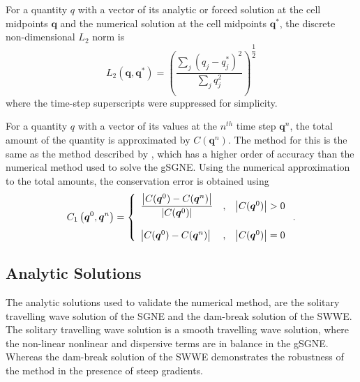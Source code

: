 \documentclass[10pt]{elsarticle}
\newcommand{\vecn}[1]{\boldsymbol{#1}}
\providecommand{\DIFaddtex}[1]{{\protect\color{blue} \sf #1}} %
\providecommand{\DIFdeltex}[1]{{\protect\color{red} \scriptsize #1}} %
\providecommand{\DIFaddbegin}{} %
\providecommand{\DIFaddend}{} %
\providecommand{\DIFdelbegin}{} %
\providecommand{\DIFdelend}{} %
\providecommand{\DIFadd}[1]{\texorpdfstring{\DIFaddtex{#1}}{#1}} %
\providecommand{\DIFdel}[1]{\texorpdfstring{\DIFdeltex{#1}}{}} %
\newcommand{\DIFscaledelfig}{0.5}
\newlength{\DIFdelgraphicswidth} %
\newlength{\DIFdelgraphicsheight} %
\newcommand{\DIFaddincludegraphics}[2][]{{\color{blue}\fbox{\DIFOincludegraphics[#1]{#2}}}} %
\newcommand{\DIFdelincludegraphics}[2][]{%
\sbox{\DIFdelgraphicsbox}{\DIFOincludegraphics[#1]{#2}}%
\settoboxwidth{\DIFdelgraphicswidth}{\DIFdelgraphicsbox} %
\settoboxtotalheight{\DIFdelgraphicsheight}{\DIFdelgraphicsbox} %
\scalebox{\DIFscaledelfig}{%
\parbox[b]{\DIFdelgraphicswidth}{\usebox{\DIFdelgraphicsbox}\\[-\baselineskip] \rule{\DIFdelgraphicswidth}{0em}}\llap{\resizebox{\DIFdelgraphicswidth}{\DIFdelgraphicsheight}{%
\setlength{\unitlength}{\DIFdelgraphicswidth}%
\begin{picture}(1,1)%
\thicklines\linethickness{2pt} %
{\color[rgb]{1,0,0}\put(0,0){\framebox(1,1){}}}%
{\color[rgb]{1,0,0}\put(0,0){\line( 1,1){1}}}%
{\color[rgb]{1,0,0}\put(0,1){\line(1,-1){1}}}%
\end{picture}%
}\hspace*{3pt}}} %
} %
\DeclareRobustCommand{\DIFaddbegin}{\DIFOaddbegin \let\includegraphics\DIFaddincludegraphics} %
\DeclareRobustCommand{\DIFaddend}{\DIFOaddend \let\includegraphics\DIFOincludegraphics} %
\DeclareRobustCommand{\DIFdelbegin}{\DIFOdelbegin \let\includegraphics\DIFdelincludegraphics} %
\DeclareRobustCommand{\DIFdelend}{\DIFOaddend \let\includegraphics\DIFOincludegraphics} %
\begin{document}
For a quantity $q$ with a vector of its analytic or forced solution at the cell midpoints $\vecn{q}$ and the numerical solution at the cell midpoints $\vecn{q}^*$, the discrete non-dimensional $L_2$ norm is
\begin{equation}
\label{eqn:Conv_Error}
L_2\left(\vecn{q},\vecn{q}^*\right) = \left( \dfrac{\displaystyle\sum_{j}^{}  \left(q_j - q^*_j\right)^2}{\displaystyle\sum_{j}^{}  q_j^2 } \right)^{\dfrac{1}{2}}
\end{equation}
where the time-step superscripts were suppressed for simplicity.

For a quantity $q$ with a vector of its values at the $n^{th}$ time step $\vecn{q}^n$, the total amount of the quantity is approximated by $C(\vecn{q}^n)$. The method for this is the same as the method described by \citet{Zoppou-etal-2017}, which has a higher order of accuracy than the numerical method used to solve the gSGNE. Using the numerical approximation to the total amounts, the conservation error is obtained using
\begin{equation}
\label{eqn:Cons_Error}
C_1\left(\vecn{q}^0,\vecn{q}^n\right) = \left \lbrace \begin{array}{l c r}
\dfrac{\left | C(\vecn{q}^0) - C(\vecn{q}^n) \right |}{\left| C(\vecn{q}^0) \right|} &,& \left| C(\vecn{q}^0) \right| > 0 \\ \\
\left | C(\vecn{q}^0) - C(\vecn{q}^n) \right |&,& \left| C(\vecn{q}^0) \right| = 0 
\end{array} \right. .
\end{equation}


\subsection{Analytic Solutions}
\label{sec:AnaSol}
The analytic solutions used to validate the numerical method, are the solitary travelling wave solution of the SGNE and the dam-break solution of the SWWE. The solitary travelling wave solution is a smooth travelling wave solution, where the \DIFdelbegin \DIFdel{non-linear }\DIFdelend \DIFaddbegin \DIFadd{nonlinear }\DIFaddend and dispersive terms are in balance in the gSGNE. Whereas the dam-break solution of the SWWE demonstrates the robustness of the method in the presence of steep gradients. 
\end{document}
